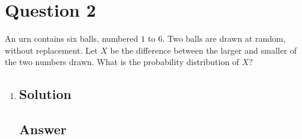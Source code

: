 \documentclass[12pt]{article}
\begin{document}
	
	\section*{Question 2}
	
	\noindent An urn contains six balls, numbered $1$ to $6$. Two balls are drawn at random, without replacement. Let $X$ be the difference between the larger and smaller of the two numbers drawn. What is the probability distribution of $X$?
	
	\bigskip
	
	\begin{enumerate}[label={},leftmargin=0in]\item
		\subsection*{Solution}
		
		\subsection*{Answer}
		
			\[\boxed{}\]
	\end{enumerate}
	
\end{document}
